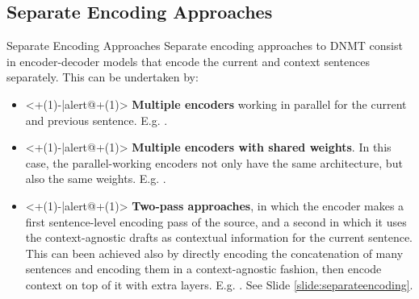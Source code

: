 \subsection{Separate Encoding Approaches}

\begin{frame}{Separate Encoding Approaches}
Separate encoding approaches to DNMT consist in encoder-decoder models that encode the current and context sentences separately. This can be undertaken by:
	\begin{itemize}
		\item<+(1)-|alert@+(1)> \textbf{Multiple encoders} working in parallel for the current and previous sentence. E.g. \cite{wang_exploiting_2017}.
		\item<+(1)-|alert@+(1)> \textbf{Multiple encoders with shared weights}. In this case, the parallel-working encoders not only have the same architecture, but also the same weights. E.g. \cite{voita_context-aware_2018}.
		\item<+(1)-|alert@+(1)> \textbf{Two-pass approaches}, in which the encoder makes a first sentence-level encoding pass of the source, and a second in which it uses the context-agnostic drafts as contextual information for the current sentence. This can been achieved also by directly encoding the concatenation of many sentences and encoding them in a context-agnostic fashion, then encode context on top of it with extra layers. E.g. \cite{zheng_toward_2020}. See Slide \ref{slide:separateencoding}.
	\end{itemize}  
\end{frame}

